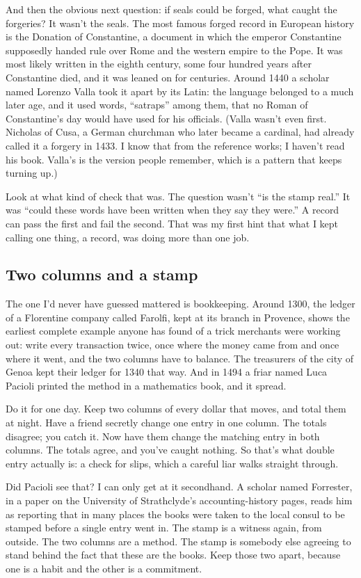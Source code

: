 \documentclass[11pt,twoside]{article}
\theoremstyle{thielethm}
\theoremstyle{thieledef}
\theoremstyle{thieledef}
\theoremstyle{thieledef}
\theoremstyle{thielethm}
\theoremstyle{thieleobs}
\theoremstyle{thielethm}
\begin{document}
And then the obvious next question: if seals could be forged, what caught the forgeries? It wasn't the seals. The most famous forged record in European history is the Donation of Constantine, a document in which the emperor Constantine supposedly handed rule over Rome and the western empire to the Pope. It was most likely written in the eighth century, some four hundred years after Constantine died, and it was leaned on for centuries. Around 1440 a scholar named Lorenzo Valla took it apart by its Latin: the language belonged to a much later age, and it used words, ``satraps'' among them, that no Roman of Constantine's day would have used for his officials. (Valla wasn't even first. Nicholas of Cusa, a German churchman who later became a cardinal, had already called it a forgery in 1433. I know that from the reference works; I haven't read his book. Valla's is the version people remember, which is a pattern that keeps turning up.)

Look at what kind of check that was. The question wasn't ``is the stamp real.'' It was ``could these words have been written when they say they were.'' A record can pass the first and fail the second. That was my first hint that what I kept calling one thing, a record, was doing more than one job.

\subsection{Two columns and a stamp}

The one I'd never have guessed mattered is bookkeeping. Around 1300, the ledger of a Florentine company called Farolfi, kept at its branch in Provence, shows the earliest complete example anyone has found of a trick merchants were working out: write every transaction twice, once where the money came from and once where it went, and the two columns have to balance. The treasurers of the city of Genoa kept their ledger for 1340 that way. And in 1494 a friar named Luca Pacioli printed the method in a mathematics book, and it spread.

Do it for one day. Keep two columns of every dollar that moves, and total them at night. Have a friend secretly change one entry in one column. The totals disagree; you catch it. Now have them change the matching entry in both columns. The totals agree, and you've caught nothing. So that's what double entry actually is: a check for slips, which a careful liar walks straight through.

Did Pacioli see that? I can only get at it secondhand. A scholar named Forrester, in a paper on the University of Strathclyde's accounting-history pages, reads him as reporting that in many places the books were taken to the local consul to be stamped before a single entry went in. The stamp is a witness again, from outside. The two columns are a method. The stamp is somebody else agreeing to stand behind the fact that these are the books. Keep those two apart, because one is a habit and the other is a commitment.
\end{document}

